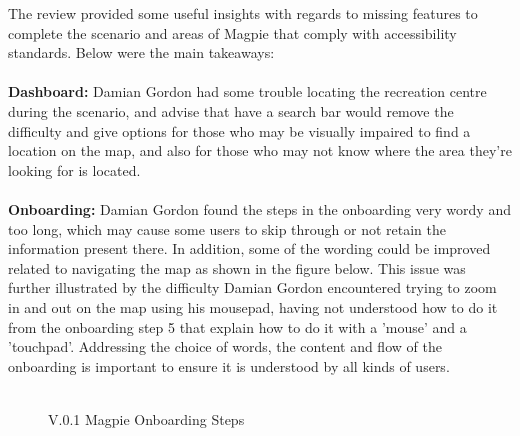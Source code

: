 \newpage
\noindent The review provided some useful insights with regards to missing features to complete the scenario and areas of Magpie that comply with accessibility standards. Below were the main takeaways:\\\\
\textbf{Dashboard: }
Damian Gordon had some trouble locating the recreation centre during the scenario, and advise that have a search bar would remove the difficulty and give options for those who may be visually impaired to find a location on the map, and also for those who may not know where the area they're looking for is located.\\\\
\textbf{Onboarding: }
Damian Gordon found the steps in the onboarding very wordy and too long, which may cause some users to skip through or not retain the information present there. In addition, some of the wording could be improved related to navigating the map as shown in the figure below. This issue was further illustrated by the difficulty Damian Gordon encountered trying to zoom in and out on the map using his mousepad, having not understood how to do it from the onboarding step 5 that explain how to do it with a 'mouse' and a 'touchpad'. Addressing the choice of words, the content and flow of the onboarding is important to ensure it is understood by all kinds of users.\\\\
\begin{figure}[h!]
    \centering
    \caption{V.0.1 Magpie Onboarding Steps}
\end{figure}


